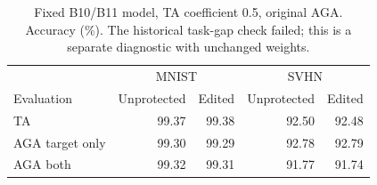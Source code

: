 \begin{table}[t]
\centering
\small
\begin{tabular}{lrrrr}
\toprule
 & \multicolumn{2}{c}{MNIST} & \multicolumn{2}{c}{SVHN} \\
Evaluation & Unprotected & Edited & Unprotected & Edited \\
\midrule
TA & 99.37 & 99.38 & 92.50 & 92.48 \\
AGA target only & 99.30 & 99.29 & 92.78 & 92.79 \\
AGA both & 99.32 & 99.31 & 91.77 & 91.74 \\
\bottomrule
\end{tabular}
\caption{Fixed B10/B11 model, TA coefficient 0.5, original AGA. Accuracy (\%). The historical task-gap check failed; this is a separate diagnostic with unchanged weights.}
\label{tab:joint-response-diagnostic}
\end{table}
